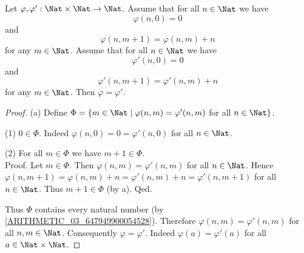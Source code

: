 \documentclass{article}
\begin{document}
  \begin{forthel}
    \begin{lemma}\label{mul_uniqueness}
      Let $\varphi, \varphi' : \Nat \times \Nat \to \Nat$.
      Assume that for all $n \in \Nat$ we have
      \[\varphi(n, 0) = 0\]
      and
      \[\varphi(n, m + 1) = \varphi(n,m) + n\]
      for any $m \in \Nat$.
      Assume that for all $n \in \Nat$ we have
      \[\varphi'(n, 0) = 0\]
      and
      \[\varphi'(n, m + 1) = \varphi'(n,m) + n\]
      for any $m \in \Nat$.
      Then $\varphi = \varphi'$.
    \end{lemma}
    \begin{proof}
      (a) Define $\Phi = \{ m \in \Nat \mid \varphi(n,m) = \varphi'(n,m)$ for
      all $n \in \Nat \}$.

      (1) $0 \in \Phi$.
      Indeed $\varphi(n,0) = 0 = \varphi'(n,0)$ for all $n \in \Nat$.

      (2) For all $m \in \Phi$ we have $m + 1 \in \Phi$. \\
      Proof.
        Let $m \in \Phi$.
        Then $\varphi(n,m) = \varphi'(n,m)$ for all $n \in \Nat$.
        Hence $\varphi(n, m + 1)
          = \varphi(n,m) + n
          = \varphi'(n,m) + n
          = \varphi'(n, m + 1)$
        for all $n \in \Nat$.
        Thus $m + 1 \in \Phi$ (by a).
      Qed.

      Thus $\Phi$ contains every natural number (by \cref{ARITHMETIC_03_647949900054528}).
      Therefore $\varphi(n,m) = \varphi'(n,m)$ for all $n, m \in \Nat$.
      Consequently $\varphi = \varphi'$.
      Indeed $\varphi(a) = \varphi'(a)$ for all $a \in \Nat \times \Nat$.
    \end{proof}
  \end{forthel}
\end{document}
